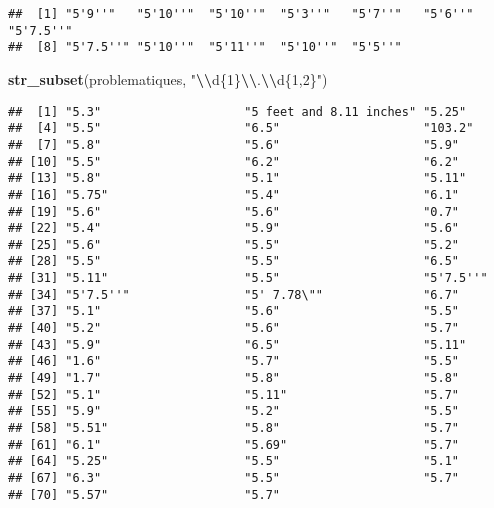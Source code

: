 \documentclass[
]{article}
\newenvironment{Shaded}{\begin{snugshade}}{\end{snugshade}}
\newcommand{\FunctionTok}[1]{\textcolor[rgb]{0.13,0.29,0.53}{\textbf{#1}}}
\newcommand{\NormalTok}[1]{#1}
\newcommand{\SpecialCharTok}[1]{\textcolor[rgb]{0.81,0.36,0.00}{\textbf{#1}}}
\newcommand{\StringTok}[1]{\textcolor[rgb]{0.31,0.60,0.02}{#1}}
\begin{document}
\begin{verbatim}
##  [1] "5'9''"   "5'10''"  "5'10''"  "5'3''"   "5'7''"   "5'6''"   "5'7.5''"
##  [8] "5'7.5''" "5'10''"  "5'11''"  "5'10''"  "5'5''"
\end{verbatim}

\begin{Shaded}
\begin{Highlighting}[]
\FunctionTok{str\_subset}\NormalTok{(problematiques, }\StringTok{"}\SpecialCharTok{\textbackslash{}\textbackslash{}}\StringTok{d\{1\}}\SpecialCharTok{\textbackslash{}\textbackslash{}}\StringTok{.}\SpecialCharTok{\textbackslash{}\textbackslash{}}\StringTok{d\{1,2\}"}\NormalTok{)}
\end{Highlighting}
\end{Shaded}

\begin{verbatim}
##  [1] "5.3"                    "5 feet and 8.11 inches" "5.25"                  
##  [4] "5.5"                    "6.5"                    "103.2"                 
##  [7] "5.8"                    "5.6"                    "5.9"                   
## [10] "5.5"                    "6.2"                    "6.2"                   
## [13] "5.8"                    "5.1"                    "5.11"                  
## [16] "5.75"                   "5.4"                    "6.1"                   
## [19] "5.6"                    "5.6"                    "0.7"                   
## [22] "5.4"                    "5.9"                    "5.6"                   
## [25] "5.6"                    "5.5"                    "5.2"                   
## [28] "5.5"                    "5.5"                    "6.5"                   
## [31] "5.11"                   "5.5"                    "5'7.5''"               
## [34] "5'7.5''"                "5' 7.78\""              "6.7"                   
## [37] "5.1"                    "5.6"                    "5.5"                   
## [40] "5.2"                    "5.6"                    "5.7"                   
## [43] "5.9"                    "6.5"                    "5.11"                  
## [46] "1.6"                    "5.7"                    "5.5"                   
## [49] "1.7"                    "5.8"                    "5.8"                   
## [52] "5.1"                    "5.11"                   "5.7"                   
## [55] "5.9"                    "5.2"                    "5.5"                   
## [58] "5.51"                   "5.8"                    "5.7"                   
## [61] "6.1"                    "5.69"                   "5.7"                   
## [64] "5.25"                   "5.5"                    "5.1"                   
## [67] "6.3"                    "5.5"                    "5.7"                   
## [70] "5.57"                   "5.7"
\end{verbatim}
\end{document}
